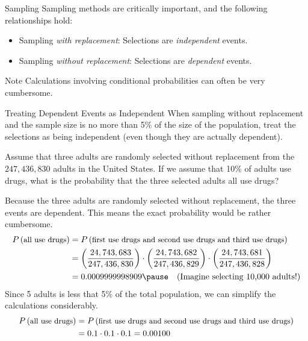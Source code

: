 \documentclass{beamer}
\newcommand{\prob}[1]{P\left(#1\right)}
\begin{document}
\begin{frame}
\begin{block}{Sampling}
Sampling methods are critically important, and the following relationships hold:
\begin{itemize}
\item Sampling \emph{with replacement}: Selections are \emph{independent} events.
\item Sampling \emph{without replacement}: Selections are \emph{dependent} events.
\end{itemize}
\end{block}\pause

\begin{block}{Note}
Calculations involving conditional probabilities can often be very cumbersome.
\end{block}\pause

\begin{block}{Treating Dependent Events as Independent}
When sampling without replacement and the sample size is no more than 5\% of the size of the population, treat the selections as being independent (even though they are actually dependent).
\end{block}
\end{frame}

\begin{frame}
\begin{example}
Assume that three adults are randomly selected without replacement from the $247,436,830$ adults in the United States. If we assume that 10\% of adults use drugs, what is the probability that the three selected adults all use drugs?\pause

Because the three adults are randomly selected without replacement, the three events are dependent. This means the exact probability would be rather cumbersome. 
\vspace{-2mm}
\begin{equation*}
\begin{aligned}
\prob{\text{\small all use drugs}} &= \prob{\text{\small first use drugs and second use drugs and third use drugs}}\\
&=\left(\dfrac{24,743,683}{247,436,830}\right)\cdot\left(\dfrac{24,743,682}{247,436,829}\right)\cdot\left(\dfrac{24,743,681}{247,436,828}\right)\\
&=0.0009999998909\pause\quad\text{(Imagine selecting 10,000 adults!)}
\end{aligned}
\end{equation*}\pause
Since 5 adults is less that 5\% of the total population, we can simplify the calculations considerably.
\vspace{-2mm}
\begin{equation*}
\begin{aligned}
\prob{\text{\small all use drugs}} &= \prob{\text{\small first use drugs and second use drugs and third use drugs}}\\
&=0.1\cdot0.1\cdot0.1=0.00100
\end{aligned}
\end{equation*}
\end{example}
\end{frame}
\end{document}
